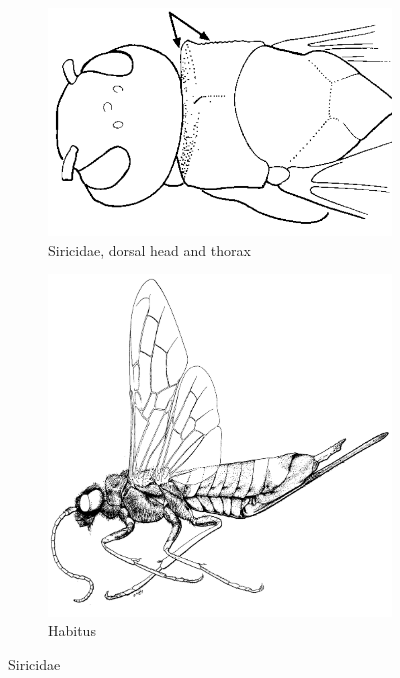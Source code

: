 \documentclass[letterpaper, 11pt]{article}
\begin{document}
\begin{figure}[ht!]
    \centering
    \begin{subfigure}[ht!]{0.4\textwidth}
        \includegraphics[width=\textwidth]{SiricidPronotum}
        \caption{Siricidae, dorsal head and thorax \citep[][pg. 70]{goulet1993hymenoptera}}
        \label{fig:siricid1}
    \end{subfigure}
    \hfill
    \begin{subfigure}[ht!]{0.45\textwidth}
        \includegraphics[width=\textwidth]{SiricidHabitus}
        \caption{Habitus \citep[][Fig. 25]{goulet1993hymenoptera}}
        \label{fig:siricid2}
    \end{subfigure}
    \caption{Siricidae}\label{fig:siricids}
\end{figure}
\end{document}
